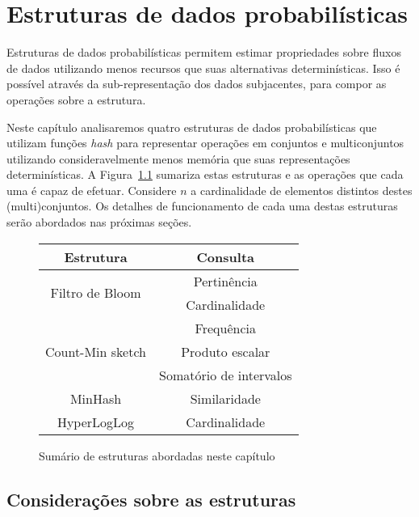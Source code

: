 \chapter{Estruturas de dados probabilísticas}\label{cap:probds}

Estruturas de dados probabilísticas permitem estimar propriedades sobre fluxos de dados utilizando menos recursos que suas alternativas determinísticas. Isso é possível através da sub-representação dos dados subjacentes, para compor as operações sobre a estrutura.

Neste capítulo analisaremos quatro estruturas de dados probabilísticas que utilizam funções \emph{hash} para representar operações em conjuntos e multiconjuntos utilizando consideravelmente menos memória que suas representações determinísticas. A Figura~\ref{fig:probds_table} sumariza estas estruturas e as operações que cada uma é capaz de efetuar. Considere $n$ a cardinalidade de elementos distintos destes (multi)conjuntos. Os detalhes de funcionamento de cada uma destas estruturas serão abordados nas próximas seções.
\begin{figure}[!htbp]
\centering
\begin{tabular}{ | c | c | }
\hline
    \textbf{Estrutura} & \textbf{Consulta} \\
\hline
\hline
    \multirow{2}{*}{Filtro de Bloom} &     
    Pertinência \\
\cline{2-2}
    & Cardinalidade \\
\hline
\hline
    \multirow{3}{*}{Count-Min sketch} &      
    Frequência \\
\cline{2-2}
    & Produto escalar \\
\cline{2-2}
    & Somatório de intervalos \\
\hline
\hline
  MinHash & 
  Similaridade \\
\hline
\hline
  HyperLogLog & 
  Cardinalidade \\
\hline
\end{tabular}
\caption{Sumário de estruturas abordadas neste capítulo}
\label{fig:probds_table}
\end{figure}









\section{Considerações sobre as estruturas}

